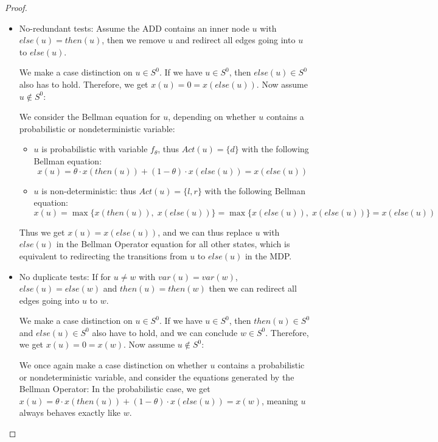\begin{proof}
	\begin{itemize}
		\item No-redundant tests: Assume the ADD contains an inner node $u$ with $\mathit{else}(u) = \mathit{then}(u)$, then we remove $u$ and redirect all edges going into $u$ to $\mathit{else}(u)$.
		
		We make a case distinction on $u \in S^0$.
		If we have $u \in S^0$, then $\mathit{else}(u) \in S^0$ also has to hold. 
		Therefore, we get $x(u) = 0 = x(\mathit{else}(u))$.
		Now assume $u\notin S^0$:
		
		We consider the Bellman equation for $u$, depending on whether $u$ contains a probabilistic or nondeterministic variable:
		\begin{itemize}
			\item $u$ is probabilistic with variable $f_\theta$, thus $\mathit{Act(u)} = \{d\}$ with the following Bellman equation:
			$$x(u) = \theta\cdot x(\mathit{then}(u)) + (1 - \theta)\cdot x(\mathit{else}(u)) = x(\mathit{else}(u))$$
			\item $u$ is non-deterministic: thus $\mathit{Act(u)} = \{l,r\}$ with the following Bellman equation:
			$$x(u) = \max \{x(\mathit{then}(u)), \; x(\mathit{else}(u))\} = \max \{x(\mathit{else}(u)),\; x(\mathit{else}(u))\} = x(\mathit{else}(u))$$
		\end{itemize} 
		Thus we get $x(u) = x(\mathit{else}(u))$, and we can thus replace $u$ with $\mathit{else}(u)$ in the Bellman Operator equation for all other states, which is equivalent to redirecting the transitions from $u$ to $\mathit{else}(u)$ in the MDP.\\
		
		
		\item No duplicate tests: If for $u \neq w$ with $\mathit{var}(u) = \mathit{var}(w)$, $\mathit{else}(u) = \mathit{else}(w)$ and $\mathit{then}(u) = \mathit{then}(w)$ then we can redirect all edges going into $u$ to $w$.
		
		We make a case distinction on $u \in S^0$.
		If we have $u \in S^0$, then $\mathit{then}(u) \in S^0$ and $\mathit{else}(u) \in S^0$ also have to hold, and we can conclude $w \in S^0$.
		Therefore, we get $x(u) = 0 = x(w)$.
		Now assume $u\notin S^0$:
		
		We once again make a case distinction on whether $u$ contains a probabilistic or nondeterministic variable, and consider the equations generated by the Bellman Operator:
		In the probabilistic case, we get $x(u) = \theta \cdot x(\mathit{then}(u)) + (1- \theta)\cdot x(\mathit{else}(u)) = x(w)$, meaning $u$ always behaves exactly like $w$.
		

\end{itemize}
\end{proof}
